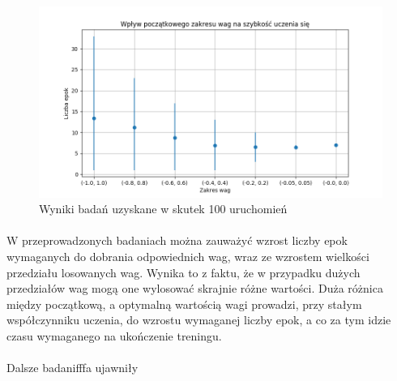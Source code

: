 \documentclass[../main.tex]{subfiles}
\begin{document}
    \begin{figure}[H]
    \centering
    \includegraphics[scale=0.7]{test_weights_SimplePerceptron_100}
    \caption{Wyniki badań uzyskane w skutek 100 uruchomień}
    \end{figure}
    
    \paragraph{}
    W przeprowadzonych badaniach można zauważyć wzrost liczby epok wymaganych do dobrania odpowiednich wag, wraz ze wzrostem wielkości przedziału losowanych wag. Wynika to z faktu, że w przypadku dużych przedziałów wag mogą one wylosować skrajnie różne wartości. Duża różnica między początkową, a optymalną wartością wagi prowadzi, przy stałym współczynniku uczenia, do wzrostu wymaganej liczby epok, a co za tym idzie czasu wymaganego na ukończenie treningu.
    
    \paragraph{}
    Dalsze badanifffa ujawniły 
    
    
    
\end{document}
